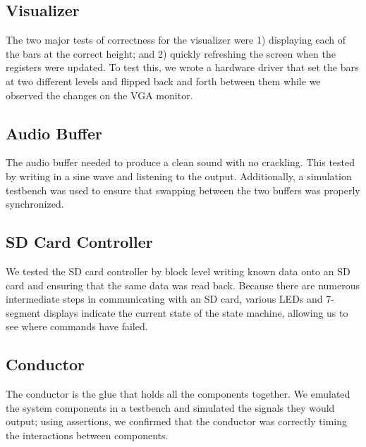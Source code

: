 \documentclass{article}
\begin{document}
\subsection{Visualizer}

The two major tests of correctness for the visualizer were 1) displaying each
of the bars at the correct height; and 2) quickly refreshing the screen when
the registers were updated. To test this, we wrote a hardware driver that set
the bars at two different levels and flipped back and forth between them while
we observed the changes on the VGA monitor.

\subsection{Audio Buffer}

The audio buffer needed to produce a clean sound with no crackling. This tested
by writing in a sine wave and listening to the output. Additionally, a
simulation testbench was used to ensure that swapping between the two buffers
was properly synchronized.

\subsection{SD Card Controller}

We tested the SD card controller by block level writing known data onto an SD
card and ensuring that the same data was read back. Because there are numerous
intermediate steps in communicating with an SD card, various LEDs and 7-segment
displays indicate the current state of the state machine, allowing us to see
where commands have failed.

\subsection{Conductor}

The conductor is the glue that holds all the components together. We emulated
the system components in a testbench and simulated the signals they would
output; using assertions, we confirmed that the conductor was correctly timing
the interactions between components.
\end{document}
